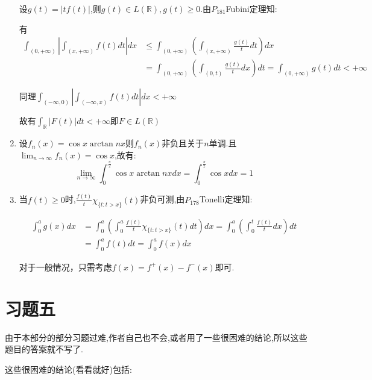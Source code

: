 \documentclass[UTF8, a4paper, 12pt, oneside, onecolumn]{article}
\numberwithin{equation}{section}
\numberwithin{figure}{section}
\numberwithin{table}{section}
\theoremstyle{nonumberplain}	%
\theoremstyle{plain}	%
\theoremstyle{plain}	%
\theoremstyle{plain}	%
\theoremstyle{plain}	%
\theoremstyle{nonumberplain}
\begin{document}
\begin{enumerate}
	设$g(t)=|tf(t)|$,则$g(t)\in L(\mathbb{R}),g(t)\geqslant 0$.由$P_{181}$Fubini定理知:
	
	有
	\begin{align*}
		\displaystyle\int_{(0,+\infty)}\left|\int_{(x,+\infty)}f(t)dt\right|dx &\leqslant\int_{(0,+\infty)}\left(\int_{(x,+\infty)}\frac{g(t)}{t}dt\right)dx\\
		&=\int_{(0,+\infty)}\left(\int_{(0,t)}\frac{g(t)}{t}dx\right)dt =\int_{(0,+\infty)}g(t)dt<+\infty
	\end{align*}
	
	同理$\displaystyle\int_{(-\infty,0)}\left|\int_{(-\infty,x)}f(t)dt\right|dx<+\infty$
	
	故有$\displaystyle\int_{\mathbb{R}}|F(t)|dt<+\infty$即$F\in L(\mathbb{R})$
	\item 设$f_n(x)=\cos x \arctan nx$则$f_n(x)$非负且关于$n$单调.且$\displaystyle\lim_{n\rightarrow \infty}f_n(x)=\cos x$,故有:
	$$\lim_{n\rightarrow \infty}\int_0^\frac{\pi}{2}\cos x \arctan{nx}dx=\int_0^\frac{\pi}{2}\cos xdx=1 $$
	\item 当$f(t)\geqslant0$时,$\displaystyle\frac{f(t)}{t}\chi_{\{t:t>x\}}(t)$非负可测,由$P_{178}$Tonelli定理知:

	\begin{align*}
		\displaystyle\int_0^a g(x)dx &=\int_0^a(\int_0^a\frac{f(t)}{t}\chi_{\{t:t>x\}}(t)dt)dx=\int_0^a(\int_0^t\frac{f(t)}{t}dx)dt\\
		&=\int_0^af(t)dt=\int_0^af(x)dx 
	\end{align*}
	
	对于一般情况，只需考虑$f(x)=f^+(x)-f^-(x)$即可.
\end{enumerate}

\part{习题五}

由于本部分的部分习题过难,作者自己也不会,或者用了一些很困难的结论,所以这些题目的答案就不写了.

这些很困难的结论(看看就好)包括:
\end{document}
